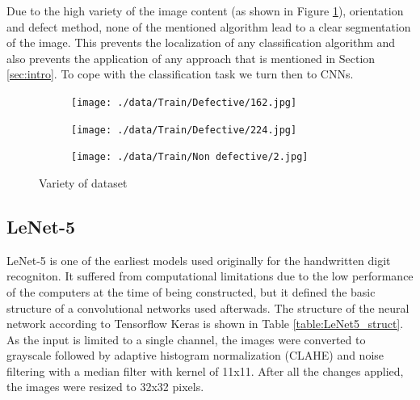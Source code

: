 \documentclass[10pt, final]{article}
\begin{document}
Due to the high variety of the image content (as shown in Figure \ref{fig:variety}),
orientation and defect method, none of the mentioned algorithm lead to a clear segmentation of the image.
This prevents the localization of any classification algorithm and also prevents the application of any approach that
is mentioned in Section \ref{sec:intro}.
To cope with the classification task we turn then to CNNs.

\begin{figure}[!ht]
	\centering
	\begin{subfigure}{0.3\textwidth}
		\centering
		\texttt{[image: ./data/Train/Defective/162.jpg]}
	\end{subfigure}
	\begin{subfigure}{0.3\textwidth}
		\centering
		\texttt{[image: ./data/Train/Defective/224.jpg]}
	\end{subfigure}
	\begin{subfigure}{0.3\textwidth}
		\centering
		\texttt{[image: ./data/Train/Non defective/2.jpg]}
	\end{subfigure}
	\caption{Variety of dataset}
	\label{fig:variety}
\end{figure}

\subsection{LeNet-5} \label{sec:Lenet5}
LeNet-5 is one of the earliest models used originally for the handwritten digit recogniton.
It suffered from computational limitations due to the low performance of the computers at the time of being constructed,
but it defined the basic structure of a convolutional networks used afterwads.
The structure of the neural network according to Tensorflow Keras is shown in Table \ref{table:LeNet5_struct}.
As the input is limited to a single channel, the images were converted to grayscale followed by adaptive histogram
normalization (CLAHE) and noise filtering with a median filter with kernel of 11x11.
After all the changes applied, the images were resized to 32x32 pixels.
\end{document}
